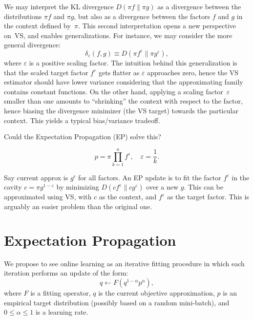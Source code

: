 \documentclass{article}
\begin{document}
We may interpret the KL divergence $D(\pi f\|\pi g)$ as a divergence between the distributions $\pi f$ and $\pi g$, but also as a divergence between the factors $f$ and $g$ in the context defined by~$\pi$. This second interpretation opens a new perspective on~VS, and enables generalizations. For instance, we may consider the more general divergence:
$$
\delta_\varepsilon (f, g) \equiv
D(\pi f^\varepsilon \|\pi g^\varepsilon),
$$
where $\varepsilon$ is a positive scaling factor. The intuition behind this generalization is that the scaled target factor $f^\varepsilon$ gets flatter as $\varepsilon$ approaches zero, hence the VS estimator should have lower variance considering that the approximating family contains constant functions. On the other hand, applying a scaling factor~$\varepsilon$ smaller than one amounts to ``shrinking'' the context with respect to the factor, hence biasing the divergence minimizer (the VS target) towards the particular context. This yields a typical bias/variance tradeoff.

Could the Expectation Propagation (EP) solve this?

$$
p = \pi \prod_{k=1}^n f^\varepsilon,
\quad
\varepsilon = \frac{1}{k}.
$$

Say current approx is $g^\epsilon$ for all factors. An EP update is to fit the factor $f^\varepsilon$ in the cavity $c=\pi g^{1-\varepsilon}$ by minimizing $D(cf^\varepsilon\|cg^\varepsilon)$ over a new $g$. This can be approximated using VS, with $c$ as the context, and $f^\varepsilon$ as the target factor. This is arguably an easier problem than the original one. 





\section{Expectation Propagation}

We propose to see online learning as an iterative fitting procedure in which each iteration performs an update of the form:
$$
q \leftarrow F(q^{1-\alpha} p^\alpha),
$$
where $F$ is a fitting operator, $q$ is the current objective approximation, $p$ is an empirical target distribution (possibly based on a random mini-batch), and $0\leq \alpha\leq 1$ is a learning rate. 

\end{document}
